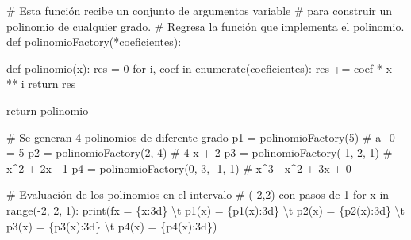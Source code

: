 \documentclass[
  letterpaper,
  DIV=11,
  numbers=noendperiod]{scrreprt}
\newenvironment{Shaded}{\begin{snugshade}}{\end{snugshade}}
\newcommand{\BuiltInTok}[1]{\textcolor[rgb]{0.00,0.23,0.31}{#1}}
\newcommand{\CharTok}[1]{\textcolor[rgb]{0.13,0.47,0.30}{#1}}
\newcommand{\CommentTok}[1]{\textcolor[rgb]{0.37,0.37,0.37}{#1}}
\newcommand{\ControlFlowTok}[1]{\textcolor[rgb]{0.00,0.23,0.31}{#1}}
\newcommand{\DecValTok}[1]{\textcolor[rgb]{0.68,0.00,0.00}{#1}}
\newcommand{\KeywordTok}[1]{\textcolor[rgb]{0.00,0.23,0.31}{#1}}
\newcommand{\NormalTok}[1]{\textcolor[rgb]{0.00,0.23,0.31}{#1}}
\newcommand{\OperatorTok}[1]{\textcolor[rgb]{0.37,0.37,0.37}{#1}}
\newcommand{\SpecialCharTok}[1]{\textcolor[rgb]{0.37,0.37,0.37}{#1}}
\newcommand{\SpecialStringTok}[1]{\textcolor[rgb]{0.13,0.47,0.30}{#1}}
\begin{document}
\begin{Shaded}
\begin{Highlighting}[]
\CommentTok{\# Esta función recibe un conjunto de argumentos variable}
\CommentTok{\# para construir un polinomio de cualquier grado.}
\CommentTok{\# Regresa la función que implementa el polinomio.}
\KeywordTok{def}\NormalTok{ polinomioFactory(}\OperatorTok{*}\NormalTok{coeficientes):}

    \KeywordTok{def}\NormalTok{ polinomio(x):}
\NormalTok{        res }\OperatorTok{=} \DecValTok{0}
        \ControlFlowTok{for}\NormalTok{ i, coef }\KeywordTok{in} \BuiltInTok{enumerate}\NormalTok{(coeficientes):}
\NormalTok{            res }\OperatorTok{+=}\NormalTok{ coef }\OperatorTok{*}\NormalTok{ x }\OperatorTok{**}\NormalTok{ i}
        \ControlFlowTok{return}\NormalTok{ res}
    
    \ControlFlowTok{return}\NormalTok{ polinomio}
\end{Highlighting}
\end{Shaded}

\begin{Shaded}
\begin{Highlighting}[]
\CommentTok{\# Se generan 4 polinomios de diferente grado}
\NormalTok{p1 }\OperatorTok{=}\NormalTok{ polinomioFactory(}\DecValTok{5}\NormalTok{)           }\CommentTok{\# a\_0 = 5}
\NormalTok{p2 }\OperatorTok{=}\NormalTok{ polinomioFactory(}\DecValTok{2}\NormalTok{, }\DecValTok{4}\NormalTok{)        }\CommentTok{\# 4 x + 2}
\NormalTok{p3 }\OperatorTok{=}\NormalTok{ polinomioFactory(}\OperatorTok{{-}}\DecValTok{1}\NormalTok{, }\DecValTok{2}\NormalTok{, }\DecValTok{1}\NormalTok{)    }\CommentTok{\# x\^{}2 + 2x {-} 1}
\NormalTok{p4 }\OperatorTok{=}\NormalTok{ polinomioFactory(}\DecValTok{0}\NormalTok{, }\DecValTok{3}\NormalTok{, }\OperatorTok{{-}}\DecValTok{1}\NormalTok{, }\DecValTok{1}\NormalTok{) }\CommentTok{\# x\^{}3 {-} x\^{}2 + 3x + 0}

\CommentTok{\# Evaluación de los polinomios en el intervalo}
\CommentTok{\# ({-}2,2) con pasos de 1}
\ControlFlowTok{for}\NormalTok{ x }\KeywordTok{in} \BuiltInTok{range}\NormalTok{(}\OperatorTok{{-}}\DecValTok{2}\NormalTok{, }\DecValTok{2}\NormalTok{, }\DecValTok{1}\NormalTok{):}
    \BuiltInTok{print}\NormalTok{(}\SpecialStringTok{f\textquotesingle{}x = }\SpecialCharTok{\{}\NormalTok{x}\SpecialCharTok{:3d\}}\SpecialStringTok{ }\CharTok{\textbackslash{}t}\SpecialStringTok{ p1(x) = }\SpecialCharTok{\{}\NormalTok{p1(x)}\SpecialCharTok{:3d\}}\SpecialStringTok{ }\CharTok{\textbackslash{}t}\SpecialStringTok{ p2(x) = }\SpecialCharTok{\{}\NormalTok{p2(x)}\SpecialCharTok{:3d\}}\SpecialStringTok{ }\CharTok{\textbackslash{}t}\SpecialStringTok{ p3(x) = }\SpecialCharTok{\{}\NormalTok{p3(x)}\SpecialCharTok{:3d\}}\SpecialStringTok{ }\CharTok{\textbackslash{}t}\SpecialStringTok{ p4(x) = }\SpecialCharTok{\{}\NormalTok{p4(x)}\SpecialCharTok{:3d\}}\SpecialStringTok{\textquotesingle{}}\NormalTok{)}
\end{Highlighting}
\end{Shaded}
\end{document}
